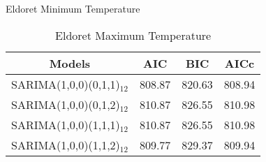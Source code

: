 \documentclass[]{beamer}
\begin{document}
\begin{frame}
\begin{columns}
\begin{column}{.25\textwidth}
\begin{table}[h!]
			\caption{Eldoret Minimum Temperature}
	\end{table}
	\begin{table}[h!]
			\begin{tabular}{c c c c}
				Models&AIC&BIC&AICc\\
				\hline
				SARIMA(1,0,0)(0,1,1)$_{12}$ & 808.87 & 820.63 & 808.94\\
				SARIMA(1,0,0)(0,1,2)$_{12}$& 810.87 & 826.55 & 810.98\\
				SARIMA(1,0,0)(1,1,1)$_{12}$ & 810.87 & 826.55 & 810.98\\
				SARIMA(1,0,0)(1,1,2)$_{12}$& 809.77 & 829.37 & 809.94\\
			\end{tabular}
			\caption{Eldoret Maximum Temperature}
			\label{tab:table51}
	\end{table}
\end{column}
\end{columns}
\end{frame}
\end{document}
